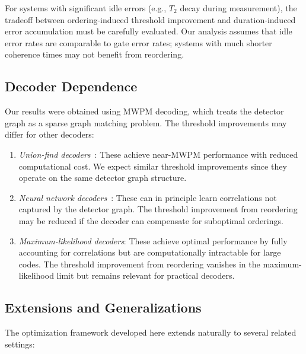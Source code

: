 \documentclass[
    reprint,
    aps,
    prx,
    superscriptaddress,
    longbibliography
]{revtex4-2}
\begin{document}
For systems with significant idle errors (e.g., $T_2$ decay during measurement), the tradeoff between ordering-induced threshold improvement and duration-induced error accumulation must be carefully evaluated. Our analysis assumes that idle error rates are comparable to gate error rates; systems with much shorter coherence times may not benefit from reordering.

\subsection{Decoder Dependence}
\label{subsec:decoder_dependence}

Our results were obtained using MWPM decoding, which treats the detector graph as a sparse graph matching problem. The threshold improvements may differ for other decoders:

\begin{enumerate}[label=(\roman*)]
    \item \emph{Union-find decoders}~\cite{Delfosse2021Almost}: These achieve near-MWPM performance with reduced computational cost. We expect similar threshold improvements since they operate on the same detector graph structure.
    \item \emph{Neural network decoders}~\cite{Torlai2017Neural, Krastanov2017Deep}: These can in principle learn correlations not captured by the detector graph. The threshold improvement from reordering may be reduced if the decoder can compensate for suboptimal orderings.
    \item \emph{Maximum-likelihood decoders}: These achieve optimal performance by fully accounting for correlations but are computationally intractable for large codes. The threshold improvement from reordering vanishes in the maximum-likelihood limit but remains relevant for practical decoders.
\end{enumerate}

\subsection{Extensions and Generalizations}
\label{subsec:extensions}

The optimization framework developed here extends naturally to several related settings:
\end{document}
